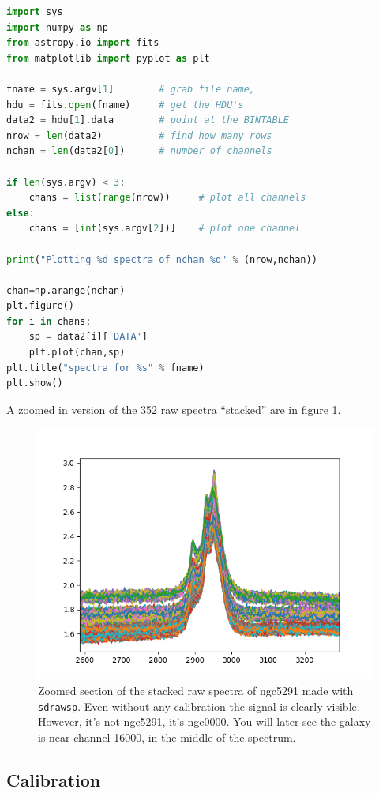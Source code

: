 \documentclass[12pt,a4paper]{article}
\begin{document}
\begin{lstlisting}[language=python]
import sys
import numpy as np
from astropy.io import fits
from matplotlib import pyplot as plt

fname = sys.argv[1]        # grab file name, 
hdu = fits.open(fname)     # get the HDU's
data2 = hdu[1].data        # point at the BINTABLE
nrow = len(data2)          # find how many rows
nchan = len(data2[0])      # number of channels

if len(sys.argv) < 3:
    chans = list(range(nrow))     # plot all channels
else:
    chans = [int(sys.argv[2])]    # plot one channel

print("Plotting %d spectra of nchan %d" % (nrow,nchan))

chan=np.arange(nchan)    
plt.figure()
for i in chans:
    sp = data2[i]['DATA']
    plt.plot(chan,sp)
plt.title("spectra for %s" % fname)        
plt.show() 
\end{lstlisting}

A zoomed in version of the 352 raw spectra ``stacked'' are in figure \ref{spectrum2}.

\begin{figure}[ht]
\centering
  \includegraphics[width=\textwidth]{sdrawsp1.png}
  \caption{\label{spectrum2} Zoomed section of the stacked raw spectra of ngc5291 made with {\tt sdrawsp}.
    Even without any calibration the signal is clearly visible. However, it's not ngc5291, it's ngc0000.
    You will later see the galaxy is near channel 16000, in the middle of the spectrum.}
\end{figure}

\subsection{Calibration}
\end{document}
